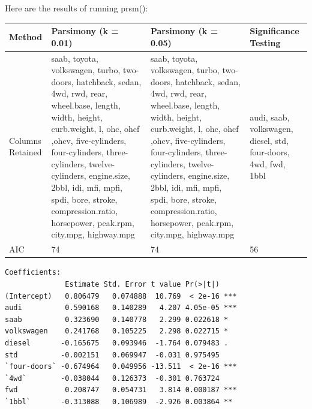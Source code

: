 \documentclass[letter]{article}
\begin{document}
Here are the results of running prsm():\\
\begin{center}
    \begin{tabular}{ | l |  p{4cm} |  p{4cm} | p{4cm} |}
    \hline
    Method & Parsimony (k = 0.01) & Parsimony (k = 0.05) & Significance Testing \\ \hline
    	
    Columns Retained & saab, toyota, volkswagen, turbo, two-doors, hatchback, sedan, 4wd, rwd, rear, wheel.base, length, width, height, curb.weight, l, ohc, ohcf ,ohcv, five-cylinders, four-cylinders, three-cylinders, twelve-cylinders, engine.size, 2bbl, idi, mfi, mpfi, spdi, bore, stroke, compression.ratio, horsepower, peak.rpm, city.mpg, highway.mpg & saab, toyota, volkswagen, turbo, two-doors, hatchback, sedan, 4wd, rwd, rear, wheel.base, length, width, height, curb.weight, l, ohc, ohcf ,ohcv, five-cylinders, four-cylinders, three-cylinders, twelve-cylinders, engine.size, 2bbl, idi, mfi, mpfi, spdi, bore, stroke, compression.ratio, horsepower, peak.rpm, city.mpg, highway.mpg & audi, saab, volkswagen, diesel, std, four-doors, 4wd, fwd, 1bbl\\ \hline
    
    AIC & 74 & 74 & 56\\ \hline
    
    \end{tabular}
\end{center}



\begin{verbatim}
Coefficients:
              Estimate Std. Error t value Pr(>|t|)    
(Intercept)   0.806479   0.074888  10.769  < 2e-16 ***
audi          0.590168   0.140289   4.207 4.05e-05 ***
saab          0.323690   0.140778   2.299 0.022618 *  
volkswagen    0.241768   0.105225   2.298 0.022715 *  
diesel       -0.165675   0.093946  -1.764 0.079483 .  
std          -0.002151   0.069947  -0.031 0.975495    
`four-doors` -0.674964   0.049956 -13.511  < 2e-16 ***
`4wd`        -0.038044   0.126373  -0.301 0.763724    
fwd           0.208747   0.054731   3.814 0.000187 ***
`1bbl`       -0.313088   0.106989  -2.926 0.003864 ** 

\end{verbatim}
 
\end{document}
